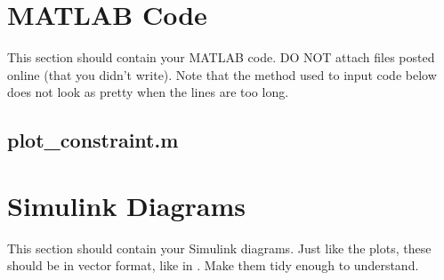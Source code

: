 \appendix

\section{MATLAB Code}\label{sec:matlab}
This section should contain your MATLAB code. DO NOT attach files posted online (that you didn't write). Note that the method used to input code below does not look as pretty when the lines are too long.

\subsection{plot\_constraint.m}\label{sec:plot_constraint_m}
\section{Simulink Diagrams}\label{sec:simulink}
This section should contain your Simulink diagrams. Just like the plots, these should be in vector format, like in . Make them tidy enough to understand.

